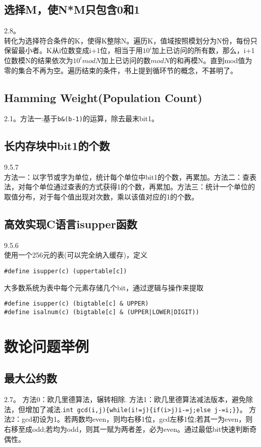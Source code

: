 \subsection{选择M，使N*M只包含0和1}
\cite{bop}2.8。\\转化为选择符合条件的K，使得K整除N。遍历K，值域按照模划分为N份，每份只保留最小者。K从i位数变成i+1位，相当于用$10^i$加上已访问的所有数，那么，i+1位数模N的结果依次为$10^i mod N$加上已访问的数$mod N$的和再模N。直到mod值为零的集合不再为空。遍历结束的条件，书上提到循环节的概念，不甚明了。

\subsection{Hamming Weight(Population Count)}
\cite{bop}2.1。方法一:基于\verb|b&(b-1)|的运算，除去最末bit1。

\subsection{长内存块中bit1的个数}
\cite{pp}9.5.7\\
方法一：以字节或字为单位，统计每个单位中bit1的个数，再累加。方法二：查表法，对每个单位通过查表的方式获得1的个数，再累加。方法三：统计一个单位的取值分布，对于每个值出现对次数，乘以该值对应的1的个数。

\subsection{高效实现C语言isupper函数}
\cite{pp}9.5.6\\
使用一个256元的表(可以完全纳入缓存)，定义
\begin{verbatim}
#define isupper(c) (uppertable[c])
\end{verbatim}
大多数系统为表中每个元素存储几个bit，通过逻辑与操作来提取
\begin{verbatim}
#define isupper(c) (bigtable[c] & UPPER)
#define isalnum(c) (bigtable[c] & (UPPER|LOWER|DIGIT))
\end{verbatim}



\section{数论问题举例}

\subsection{最大公约数}
\cite{bop}2.7。\label{subsec:gcd}
方法0：欧几里德算法，辗转相除.
方法1：欧几里德算法减法版本，避免除法，但增加了减法.\verb|int gcd(i,j){while(i!=j){if(i>j)i-=j;else j-=i;}}|。
方法2：gcd初设为1。若两数均even，则均右移1位，gcd左移1位;若其一为even，则右移至成odd;若均为odd，则其一赋为两者差，必为even。通过最低bit快速判断奇偶性。


